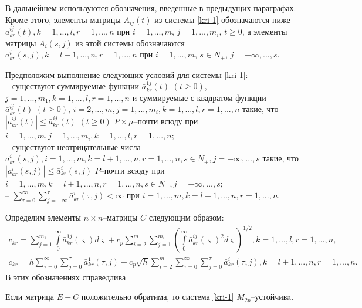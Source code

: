 В дальнейшем используются  обозначения, введенные в предыдущих
параграфах. Кроме этого, элементы матрицы $A_{ij}(t)$ из системы \eqref{kri-1}
обозначаются ниже $a^{ij}_{kr}(t), k =1,...,l, r = 1,...,n$  при $i
= 1,...,m$, $j = 1,...,m_i$, $t \geq 0$, а элементы матрицы
$A_i(s,j)$ из этой системы обозначаются $a^i_{kr}(s,j), k =
l+1,...,n, r = 1,...,n$ при $i=1,...,m$, $s\in N_+$,
$j=-\infty,...,s$.

Предположим выполнение следующих условий для системы \eqref{kri-1}:\\
\noindent
  -- существуют  суммируемые функции $\bar
a^{1j}_{kr}(t)\,\, (t\geq 0)$, $j = 1,...,m_1, k =1,...,l, r =
1,...,n$ и суммируемые с квадратом функции $\bar a^{ij}_{kr}(t)\,\,
(t\geq 0)$, $i = 2,...,m, j = 1,...,m_i, k =1,...,l, r = 1,...,n$
такие, что $|a^{ij}_{kr}(t)|\leq \bar a^{ij}_{kr}(t)\,\, (t\geq 0)$
$P\times\mu$--почти всюду при $i = 1, ..., m, j = 1,...,m_i, k
=1,...,l, r = 1,...,n$;\\
  -- существуют
неотрицательные числа $\bar a^i_{kr}(s,j),i=1,...,m, k = l+1, ...,
n, r = 1,...,n, s\in N_+, j=-\infty,...,s$ такие, что
$|a^i_{kr}(s,j)| \leq \bar a^i_{kr}(s,j)$ $P$--почти всюду при
$i=1,...,m, k = l+1, ..., n, r = 1,...,n, s\in N_+, j=-\infty,...,s
$;\\
  -- $ \sum \limits _{\tau=0 }^{\infty }\sum \limits _{j = -\infty
}^{\tau}\bar a^{i}_{kr}(\tau,j) < \infty$ при $i=1,...,m, k = l+1,
..., n, r = 1,...,n$.

Определим элементы $n\times n$--матрицы $C$ следующим образом:
$$
\begin{array}{crl}
c_{kr} = \sum \limits_{j=1}^{m_1}\int \limits _0^{\infty } \bar
a^{1j}_{kr}(\varsigma)d\varsigma + c_p \sum \limits_{i=2}^m \sum
\limits_{j=1}^{m_i}\left(\int \limits _0^{\infty } \bar
a^{ij}_{kr}(\varsigma )^2d\varsigma \right )^{1/2},  k
= 1, ... ,l, r = 1, ..., n,\\
c_{kr} = h\sum \limits _{\tau=0 }^{\infty }\sum \limits _{j=0
}^{\tau}\bar a^{1}_{kr}(\tau,j) + c_p \sqrt{h}\sum \limits
_{i=2}^{m}\sum \limits _{\tau=0 }^{\infty }\sum \limits _{j=0
}^{\tau} \bar a^{i}_{kr}(\tau,j), k = l+1, ...,n, r = 1, ..., n.
\end{array}
$$
В этих обозначениях справедлива

\begin{theorem}\label{kri-th3} Если матрица $\bar E - C$ положительно
обратима, то система \eqref{kri-1} $M_{2p}$--устой\-чивa.
\end{theorem}

